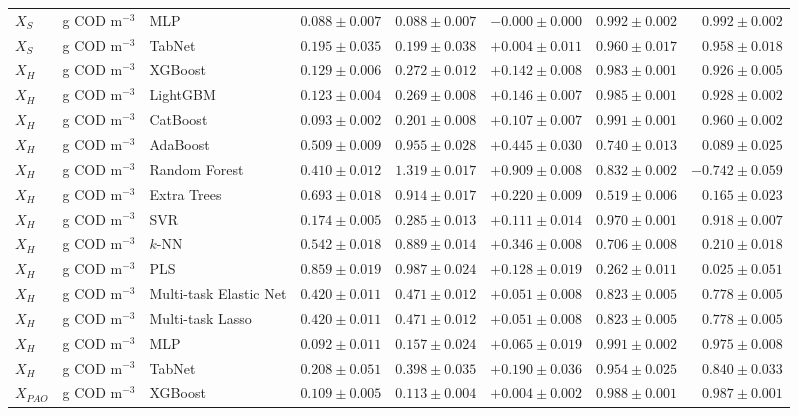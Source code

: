 \begin{longtable}{llp{3.1cm}rrrrr}
$X_{S}$ & g COD m$^{-3}$ & MLP & $0.088\pm0.007$ & $0.088\pm0.007$ & $-0.000\pm0.000$ & $0.992\pm0.002$ & $0.992\pm0.002$ \\
$X_{S}$ & g COD m$^{-3}$ & TabNet & $0.195\pm0.035$ & $0.199\pm0.038$ & $+0.004\pm0.011$ & $0.960\pm0.017$ & $0.958\pm0.018$ \\
$X_{H}$ & g COD m$^{-3}$ & XGBoost & $0.129\pm0.006$ & $0.272\pm0.012$ & $+0.142\pm0.008$ & $0.983\pm0.001$ & $0.926\pm0.005$ \\
$X_{H}$ & g COD m$^{-3}$ & LightGBM & $0.123\pm0.004$ & $0.269\pm0.008$ & $+0.146\pm0.007$ & $0.985\pm0.001$ & $0.928\pm0.002$ \\
$X_{H}$ & g COD m$^{-3}$ & CatBoost & $0.093\pm0.002$ & $0.201\pm0.008$ & $+0.107\pm0.007$ & $0.991\pm0.001$ & $0.960\pm0.002$ \\
$X_{H}$ & g COD m$^{-3}$ & AdaBoost & $0.509\pm0.009$ & $0.955\pm0.028$ & $+0.445\pm0.030$ & $0.740\pm0.013$ & $0.089\pm0.025$ \\
$X_{H}$ & g COD m$^{-3}$ & Random Forest & $0.410\pm0.012$ & $1.319\pm0.017$ & $+0.909\pm0.008$ & $0.832\pm0.002$ & $-0.742\pm0.059$ \\
$X_{H}$ & g COD m$^{-3}$ & Extra Trees & $0.693\pm0.018$ & $0.914\pm0.017$ & $+0.220\pm0.009$ & $0.519\pm0.006$ & $0.165\pm0.023$ \\
$X_{H}$ & g COD m$^{-3}$ & SVR & $0.174\pm0.005$ & $0.285\pm0.013$ & $+0.111\pm0.014$ & $0.970\pm0.001$ & $0.918\pm0.007$ \\
$X_{H}$ & g COD m$^{-3}$ & $k$-NN & $0.542\pm0.018$ & $0.889\pm0.014$ & $+0.346\pm0.008$ & $0.706\pm0.008$ & $0.210\pm0.018$ \\
$X_{H}$ & g COD m$^{-3}$ & PLS & $0.859\pm0.019$ & $0.987\pm0.024$ & $+0.128\pm0.019$ & $0.262\pm0.011$ & $0.025\pm0.051$ \\
$X_{H}$ & g COD m$^{-3}$ & Multi-task Elastic Net & $0.420\pm0.011$ & $0.471\pm0.012$ & $+0.051\pm0.008$ & $0.823\pm0.005$ & $0.778\pm0.005$ \\
$X_{H}$ & g COD m$^{-3}$ & Multi-task Lasso & $0.420\pm0.011$ & $0.471\pm0.012$ & $+0.051\pm0.008$ & $0.823\pm0.005$ & $0.778\pm0.005$ \\
$X_{H}$ & g COD m$^{-3}$ & MLP & $0.092\pm0.011$ & $0.157\pm0.024$ & $+0.065\pm0.019$ & $0.991\pm0.002$ & $0.975\pm0.008$ \\
$X_{H}$ & g COD m$^{-3}$ & TabNet & $0.208\pm0.051$ & $0.398\pm0.035$ & $+0.190\pm0.036$ & $0.954\pm0.025$ & $0.840\pm0.033$ \\
$X_{PAO}$ & g COD m$^{-3}$ & XGBoost & $0.109\pm0.005$ & $0.113\pm0.004$ & $+0.004\pm0.002$ & $0.988\pm0.001$ & $0.987\pm0.001$ \\

\end{longtable}
